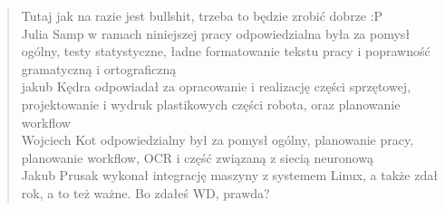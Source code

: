 \begin{quote}
    Tutaj jak na razie jest bullshit, trzeba to będzie zrobić dobrze :P \\
    Julia Samp w ramach niniejszej pracy odpowiedzialna była za pomysł ogólny, testy statystyczne, ładne formatowanie tekstu pracy i poprawność gramatyczną i ortograficzną \\
    jakub Kędra odpowiadał za opracowanie i realizację części sprzętowej, projektowanie i wydruk plastikowych części robota, oraz planowanie workflow \\
    Wojciech Kot odpowiedzialny był za pomysł ogólny, planowanie pracy, planowanie workflow, OCR i część związaną z siecią neuronową \\
    Jakub Prusak wykonał integrację maszyny z systemem Linux, a także zdał rok, a to też ważne. Bo zdałeś WD, prawda? \\
\end{quote}


